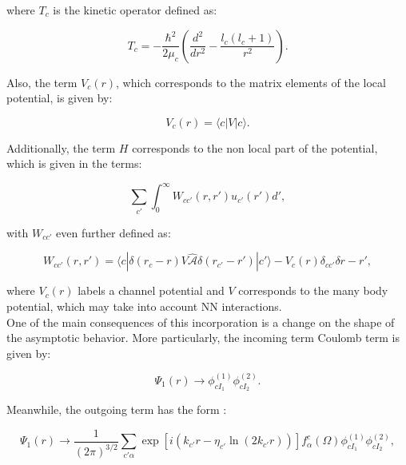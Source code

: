 \documentclass[openany]{book}
\begin{document}
where $T_c$ is the kinetic operator defined as:

\begin{equation}\label{rmatrix_channels_kineticOperator}
	T_c = -\frac{\hbar^2}{2\mu_c} \left(\frac{d^2}{dr^2} - \frac{l_c(l_c + 1)}{r^2}\right).
\end{equation}

Also, the term $V_c(r)$, which corresponds to the matrix elements of the local potential, is given by:

\begin{equation}\label{rmatrix_channels_V}
	V_c(r) = \langle c | V | c \rangle. 
\end{equation}

Additionally, the term $H$ corresponds to the non local part of the potential, which is given in the terms:

\begin{equation}\label{rmatrix_channels_nonLocal}
	\sum_{c'}{\int_{0}^{\infty} W_{cc'}(r, r')u_{c'}(r') d'},
\end{equation}

with $W_{cc'}$ even further defined as: 

\begin{equation}\label{rmatrix_channels_nonLocal_W}
	W_{cc'}(r, r') = \langle c | \delta (r_c - r) V \hat{\mathcal{A}} \delta (r_{c'} - r')|  c' \rangle - V_c(r)\delta_{cc'}\delta {r- r'},
\end{equation}

where $V_c(r)$ labels a channel potential and $V$ corresponds to the many body potential, which may take into account NN interactions. \\

One of the main consequences of this incorporation is a change on the shape of the asymptotic behavior. More particularly, the incoming term Coulomb term is given by:

 \begin{equation}\label{rmatrix_channels_incomingCoulomb}
 	\Psi_1(r) \rightarrow \phi^{(1)}_{cI_1} \phi^{(2)}_{cI_2}.
 \end{equation}

Meanwhile, the outgoing term has the form :


\begin{equation}\label{rmatrix_channels_outgoing}
	\Psi_1(r) \rightarrow \frac{1}{(2\pi)^{3/2}} \sum_{c' \alpha} \exp {[i(k_{c'}r - \eta_{c'} \ln {(2k_{c'}r )})]} f^{c}_{\alpha}(\Omega)  \phi^{(1)}_{cI_1} \phi^{(2)}_{cI_2},
\end{equation}
\end{document}
